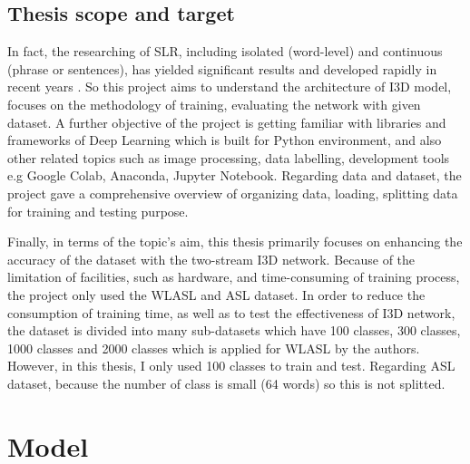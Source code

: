 \documentclass[a4paper, 12pt]{article}
\begin{document}
\subsection{Thesis scope and target}
In fact, the researching of SLR, including isolated (word-level) and continuous (phrase or sentences), has yielded significant results and developed rapidly in recent years .
So this project aims to understand the architecture of I3D model, focuses on the methodology of training, evaluating the network with given dataset. A further objective of the project is getting familiar with libraries and frameworks of Deep Learning which is built for Python environment, and also other related topics such as image processing, data labelling, development tools e.g Google Colab, Anaconda, Jupyter Notebook.
Regarding data and dataset, the project gave a comprehensive overview of organizing data, loading, splitting data for training and testing purpose.

Finally, in terms of the topic's aim, this thesis primarily focuses on enhancing the accuracy of the dataset with the two-stream I3D network. Because of the limitation of facilities, such as hardware, and time-consuming of training process, the project only used the WLASL and ASL dataset. 
In order to reduce the consumption of training time, as well as to test the effectiveness of I3D network, the dataset is divided into many sub-datasets which have 100 classes, 300 classes, 1000 classes and 2000 classes which is applied for WLASL by the authors. However, in this thesis, I only used 100 classes to train and test. Regarding ASL dataset, because the number of class is small (64 words) so this is not splitted.

\newpage

\section{Model}
\end{document}

